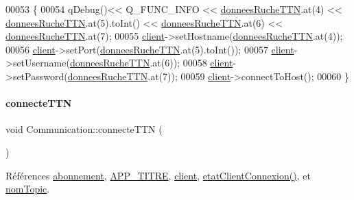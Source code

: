 \begin{DoxyCode}
00053 \{
00054     qDebug()<< Q\_FUNC\_INFO << \hyperlink{class_communication_a5b7ff98c422c16085e7dc422f2ae51c5}{donneesRucheTTN}.at(4) << 
      \hyperlink{class_communication_a5b7ff98c422c16085e7dc422f2ae51c5}{donneesRucheTTN}.at(5).toInt()  << \hyperlink{class_communication_a5b7ff98c422c16085e7dc422f2ae51c5}{donneesRucheTTN}.at(6) << 
      \hyperlink{class_communication_a5b7ff98c422c16085e7dc422f2ae51c5}{donneesRucheTTN}.at(7);
00055     \hyperlink{class_communication_a59ae01a54d6c3fde6242c46d802b954b}{client}->setHostname(\hyperlink{class_communication_a5b7ff98c422c16085e7dc422f2ae51c5}{donneesRucheTTN}.at(4));
00056     \hyperlink{class_communication_a59ae01a54d6c3fde6242c46d802b954b}{client}->setPort(\hyperlink{class_communication_a5b7ff98c422c16085e7dc422f2ae51c5}{donneesRucheTTN}.at(5).toInt());
00057     \hyperlink{class_communication_a59ae01a54d6c3fde6242c46d802b954b}{client}->setUsername(\hyperlink{class_communication_a5b7ff98c422c16085e7dc422f2ae51c5}{donneesRucheTTN}.at(6));
00058     \hyperlink{class_communication_a59ae01a54d6c3fde6242c46d802b954b}{client}->setPassword(\hyperlink{class_communication_a5b7ff98c422c16085e7dc422f2ae51c5}{donneesRucheTTN}.at(7));
00059     \hyperlink{class_communication_a59ae01a54d6c3fde6242c46d802b954b}{client}->connectToHost();
00060 \}
\end{DoxyCode}
\mbox{\label{class_communication_af71587fb1ee9b7460345b7c12372a1eb}} 
\paragraph{\texorpdfstring{connecte\+T\+TN}{connecteTTN}}
{\footnotesize\ttfamily void Communication\+::connecte\+T\+TN (\begin{DoxyParamCaption}{ }\end{DoxyParamCaption})\hspace{0.3cm}{\ttfamily [slot]}}



Références \hyperlink{class_communication_af29011664fbb15b9fb41ce37b70a694f}{abonnement}, \hyperlink{parametres_8h_ace364d1ce44aa9f79bcff6e3752c4a5f}{A\+P\+P\+\_\+\+T\+I\+T\+RE}, \hyperlink{class_communication_a59ae01a54d6c3fde6242c46d802b954b}{client}, \hyperlink{class_communication_aa6100d6b2addece57f3e74c1140a3179}{etat\+Client\+Connexion()}, et \hyperlink{class_communication_a7d536b64ee7a5373047c292477d391d5}{nom\+Topic}.



